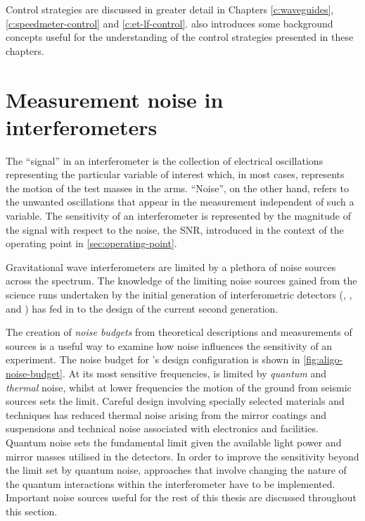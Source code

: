 Control strategies are discussed in greater detail in Chapters \ref{c:waveguides}, \ref{c:speedmeter-control} and \ref{c:et-lf-control}.  also introduces some background concepts useful for the understanding of the control strategies presented in these chapters.

\section{\label{sec:ifo-noise}Measurement noise in interferometers}
The ``signal'' in an interferometer is the collection of electrical oscillations representing the particular variable of interest which, in most cases, represents the motion of the test masses in the arms. ``Noise'', on the other hand, refers to the unwanted oscillations that appear in the measurement independent of such a variable. The sensitivity of an interferometer is represented by the magnitude of the signal with respect to the noise, the \gls{SNR}, introduced in the context of the operating point in \cref{sec:operating-point}.

Gravitational wave interferometers are limited by a plethora of noise sources across the spectrum. The knowledge of the limiting noise sources gained from the science runs undertaken by the initial generation of interferometric detectors (\LIGO{}, \VIRGO{}, \GEO{} and \TAMA{}) has fed in to the design of the current second generation.

The creation of \emph{noise budgets} from theoretical descriptions and measurements of sources is a useful way to examine how noise influences the sensitivity of an experiment. The noise budget for \ALIGO{}'s design configuration is shown in \cref{fig:aligo-noise-budget}. At its most sensitive frequencies, \ALIGO{} is limited by \emph{quantum} and \emph{thermal} noise, whilst at lower frequencies the motion of the ground from seismic sources sets the limit. Careful design involving specially selected materials and techniques has reduced thermal noise arising from the mirror coatings and suspensions and technical noise associated with electronics and facilities. Quantum noise sets the fundamental limit given the available light power and mirror masses utilised in the detectors. In order to improve the sensitivity beyond the limit set by quantum noise, approaches that involve changing the nature of the quantum interactions within the interferometer have to be implemented. Important noise sources useful for the rest of this thesis are discussed throughout this section.

